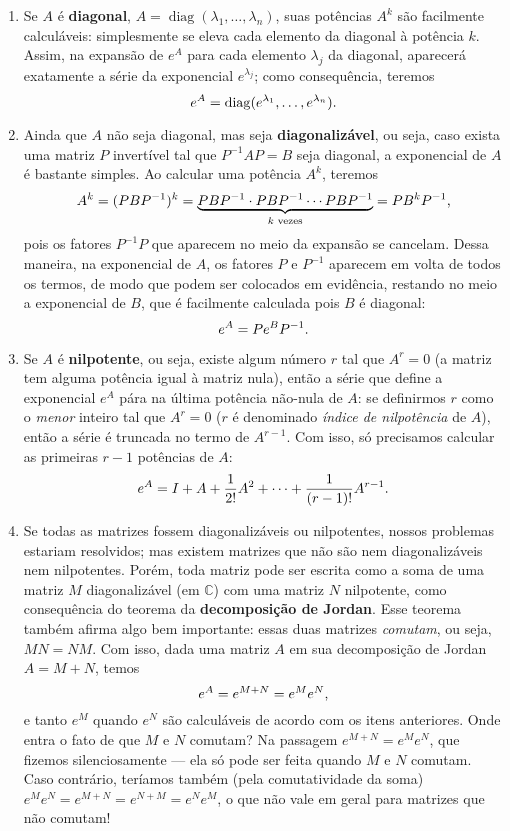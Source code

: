 \documentclass[12pt,a4paper,oneside]{memoir}
\newcommand{\C}{\mathbb{C}}
\DeclareMathOperator{\diag}{diag}
\begin{document}
\begin{enumerate}
  \item Se $A$ é \textbf{diagonal}, $A = \diag(\lambda_1, \ldots, \lambda_n)$, suas potências $A^k$ são facilmente calculáveis: simplesmente se eleva cada elemento da diagonal à potência $k$.  Assim, na expansão de $e^A$ para cada elemento $\lambda_j$ da diagonal, aparecerá exatamente a série da exponencial $e^{\lambda_j}$; como consequência, teremos \[
    e^A = \diag(e^{\lambda_1}, \ldots, e^{\lambda_n}) \text. \]

  \item Ainda que $A$ não seja diagonal, mas seja \textbf{diagonalizável}, ou seja, caso exista uma matriz $P$ invertível tal que $P^{-1} A P = B$ seja diagonal, a exponencial de $A$ é bastante simples.  Ao calcular uma potência $A^k$, teremos \[
    A^k = (P B P^{-1})^k
      = \underbrace{P B P^{-1} \cdot P B P^{-1} \cdots P B P^{-1}}_{k\text{ vezes}} = P B^k P^{-1} \text, \]
  pois os fatores $P^{-1} P$ que aparecem no meio da expansão se cancelam.  Dessa maneira, na exponencial de $A$, os fatores $P$ e $P^{-1}$ aparecem em volta de todos os termos, de modo que podem ser colocados em evidência, restando no meio a exponencial de $B$, que é facilmente calculada pois $B$ é diagonal: \[
    e^A = P e^B P^{-1} \text. \]

  \item Se $A$ é \textbf{nilpotente}, ou seja, existe algum número $r$ tal que $A^r = 0$ (a matriz tem alguma potência igual à matriz nula), então a série que define a exponencial $e^A$ pára na última potência não-nula de $A$: se definirmos $r$ como o \emph{menor} inteiro tal que $A^r = 0$ ($r$ é denominado \emph{índice de nilpotência} de $A$), então a série é truncada no termo de $A^{r-1}$.  Com isso, só precisamos calcular as primeiras $r-1$ potências de $A$: \[
    e^A = I + A + \frac{1}{2!} A^2 + \cdots + \frac{1}{(r-1)!} A^{r-1} \text. \]

  \item Se todas as matrizes fossem diagonalizáveis ou nilpotentes, nossos problemas estariam resolvidos; mas existem matrizes que não são nem diagonalizáveis nem nilpotentes.  Porém, toda matriz pode ser escrita como a soma de uma matriz $M$ diagonalizável (em $\C$) com uma matriz $N$ nilpotente, como consequência do teorema da \textbf{decomposição de Jordan}.  Esse teorema também afirma algo bem importante: essas duas matrizes \emph{comutam}, ou seja, $MN = NM$.  Com isso, dada uma matriz $A$ em sua decomposição de Jordan $A = M + N$, temos \[
    e^A = e^{M + N} = e^M e^N \text, \]
  e tanto $e^M$ quando $e^N$ são calculáveis de acordo com os itens anteriores.  Onde entra o fato de que $M$ e $N$ comutam?  Na passagem $e^{M + N} = e^M e^N$, que fizemos silenciosamente --- ela só pode ser feita quando $M$ e $N$ comutam.  Caso contrário, teríamos também (pela comutatividade da soma) $e^M e^N = e^{M + N} = e^{N + M} = e^N e^M$, o que não vale em geral para matrizes que não comutam!
\end{enumerate}
\end{document}
